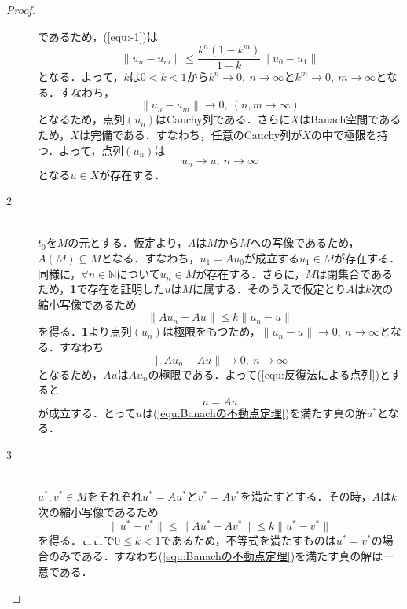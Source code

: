 \documentclass[11pt,a4paper]{jsarticle}
\theoremstyle{definition}
\begin{document}
\begin{proof}
\begin{description}
      であるため，(\ref{equ:-1})は
      \begin{equation}
        \|u_{n}-u_{m}\| \leq \frac{k^n(1-k^m)}{1-k} \|u_0-u_1\|
      \end{equation}
      となる．よって，$k$は$0<k<1$から$k^n\rightarrow 0,\ n\rightarrow \infty$と$k^m\rightarrow 0,\ m\rightarrow \infty$となる．すなわち，
      \begin{equation*}
        \|u_{n}-u_{m}\| \rightarrow 0,\ (n,m\rightarrow \infty)
      \end{equation*}
      となるため，点列$(u_n)$はCauchy列である．さらに$X$はBanach空間であるため，$X$は完備である．すなわち，任意のCauchy列が$X$の中で極限を持つ．よって，点列$(u_n)$は
      \begin{equation*}
        u_n\rightarrow u,\ n\rightarrow \infty
      \end{equation*}
      となる$u \in X$が存在する．

    \item[2]
      \quad\\
      $t_0$を$M$の元とする．仮定より，$A$は$M$から$M$への写像であるため，$A(M)\subseteq M$となる．すなわち，$u_1=Au_0$が成立する$u_1\in M$が存在する．同様に，$\forall n \in \mathbb{N}$について$u_n\in M$が存在する．さらに，$M$は閉集合であるため，\textbf{1}で存在を証明した$u$は$M$に属する．そのうえで仮定とり$A$は$k$次の縮小写像であるため
      \begin{equation*}
        \|Au_n-Au\|\leq k\|u_n-u\|
      \end{equation*}
      を得る．\textbf{1}より点列$(u_n)$は極限をもつため，$\|u_n-u\|\rightarrow 0,\ n\rightarrow \infty$となる．すなわち
      \begin{equation*}
        \|Au_n-Au\|\rightarrow 0,\ n\rightarrow \infty
      \end{equation*}
      となるため，$Au$は$Au_n$の極限である．よって(\ref{equ:反復法による点列})とすると
      \begin{equation*}
        u=Au
      \end{equation*}
      が成立する．とって$u$は(\ref{equ:Banachの不動点定理})を満たす真の解$u^*$となる．

    \item[3]
      \quad\\
      $u^*,v^*\in M$をそれぞれ$u^*=Au^*$と$v^*=Av^*$を満たすとする．その時，$A$は$k$次の縮小写像であるため
      \begin{equation*}
        \|u^*-v^*\| \leq \|Au^*-Av^*\| \leq k\|u^*-v^*\|
      \end{equation*}
      を得る．ここで$0\leq k<1$であるため，不等式を満たすものは$u^*=v^*$の場合のみである．すなわち(\ref{equ:Banachの不動点定理})を満たす真の解は一意である．
  \end{description}

\end{proof}
\end{document}
